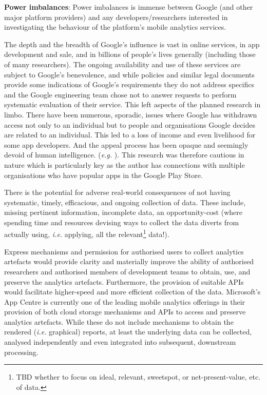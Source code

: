\textbf{Power imbalances}: 
Power imbalances is immense between Google (and other major platform providers) and any developers/researchers interested in investigating the behaviour of the platform's mobile analytics services.

The depth and the breadth of Google's influence is vast in online services, in app development and sale, and in billions of people's lives generally (including those of many researchers). The ongoing availability and use of these services are subject to Google's benevolence, and while policies and similar legal documents provide some indications of Google's requirements they do not address specifics and the Google engineering team chose not to answer requests to perform systematic evaluation of their service. This left aspects of the planned research in limbo. There have been numerous, sporadic, issues where Google has withdrawn access not only to an individual but to people and organisations Google decides are related to an individual. This led to a loss of income and even livelihood for some app developers. And the appeal process has been opaque and seemingly devoid of human intelligence.  (\textit{e.g.} ). This research was therefore cautious in nature which is particularly key as the author has connections with multiple organisations who have popular apps in the Google Play Store. 

There is the potential for adverse real-world consequences of not having systematic, timely, efficacious, and ongoing collection of data. These include, missing pertinent information, incomplete data, an opportunity-cost (where spending time and resources devising ways to collect the data diverts from actually using, \textit{i.e.} applying, all the relevant\footnote{TBD whether to focus on ideal, relevant, sweetspot, or net-present-value, etc. of data.} data!). 

Express mechanisms and permission for authorised users to collect analytics artefacts would provide clarity and materially improve the ability of authorised researchers and authorised members of development teams to obtain, use, and preserve the analytics artefacts. Furthermore, the provision of suitable APIs would facilitate higher-speed and more efficient collection of the data. Microsoft's App Centre is currently one of the leading mobile analytics offerings in their provision of both cloud storage mechanisms and APIs to access and preserve analytics artefacts. While these do not include mechanisms to obtain the rendered (\textit{i.e.} graphical) reports, at least the underlying data can be collected, analysed independently and even integrated into subsequent, downstream processing.  


